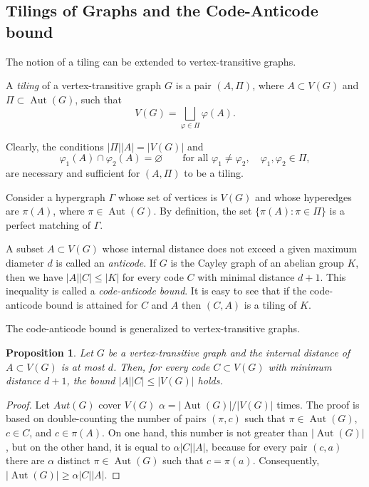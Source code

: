 \documentclass[11pt]{article}
\newtheorem{claim}{Proposition}[section]
\theoremstyle{definition}
\begin{document}
{{{\subsection{Tilings of Graphs and the Code-Anticode bound}



The notion of a tiling can be extended to vertex-transitive graphs.

A {\sl tiling} of a vertex-transitive graph $G$ is a pair $(A,\Pi)$,
where $A\subset V(G)$ and $\Pi\subset  \operatorname{Aut}(G)$, such that
\[
V(G)=\bigsqcup_{\varphi\in \Pi}\varphi(A).
\]

Clearly, the conditions
$|\Pi||A|=|V(G)|$
and
\[
\varphi_1(A)\cap\varphi_2(A)=\varnothing
\qquad\text{for all }\varphi_1\neq\varphi_2,\quad
\varphi_1,\varphi_2\in \Pi,
\]
are necessary and sufficient for $(A,\Pi)$ to be a tiling.

Consider a hypergraph $\Gamma$ whose set of vertices is $V(G)$ and whose hyperedges  are $\pi(A)$, where $\pi\in \operatorname{Aut}(G)$. By definition,  the set $\{\pi(A) : \pi\in \Pi\}$ is a perfect matching of  $\Gamma$.




A subset $A\subset V(G)$ whose internal distance does not exceed a given maximum diameter $d$ is called an {\sl anticode}. If $G$ is the Cayley graph of an abelian group $K$,  then we have $|A||C|\leq |K|$ for every code $C$ with minimal distance $d+1$.  This inequality is called a {\sl code-anticode bound}.
It is easy to see that if the  code-anticode bound is attained for $C$ and  $A$ then $(C,A)$ is a
tiling of $K$.  

The code-anticode bound is generalized to  vertex-transitive graphs. 

\begin{claim}
Let $G$ be a  vertex-transitive graph and the internal distance of  $A\subset V(G)$ is at most  $d$. Then, for every code $C\subset V(G)$ with minimum distance $d+1$, the bound $|A||C|\leq |V(G)|$ holds.
\end{claim}
\begin{proof}
Let $Aut(G)$ cover $V(G)$ $\alpha=| \operatorname{Aut}(G)|/|V(G)|$ times. 
The proof is based on double-counting the number of pairs
$(\pi, c)$ such that $\pi \in  \operatorname{Aut}(G)$, $c \in C$, and $c \in \pi(A)$. On one hand, this number is not greater than $| \operatorname{Aut}(G)|$, but on the other hand, it is equal to $\alpha|C||A|$, because for every pair $(c,a)$ there are $\alpha$ distinct $\pi\in \operatorname{Aut}(G)$ such that $c=\pi(a)$.  Consequently, $|\operatorname{Aut}(G)|\geq \alpha|C||A|$.
\end{proof}

}}}
\end{document}
